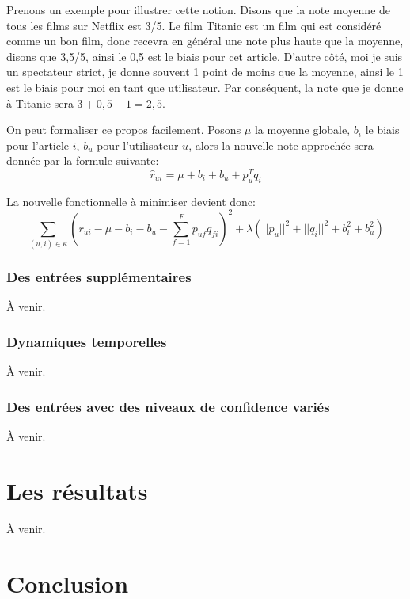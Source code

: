 \documentclass{article}
\theoremstyle{plain}
\theoremstyle{definition}
\theoremstyle{remark}
\begin{document}
Prenons un exemple pour illustrer cette notion. Disons que la note moyenne de tous les films sur Netflix est 3/5. Le film Titanic est un film qui est consid\'er\'e comme un bon film, donc recevra en g\'en\'eral une note plus haute que la moyenne, disons que 3,5/5, ainsi le 0,5 est le biais pour cet article. D'autre c\^ot\'e, moi je suis un spectateur strict, je donne souvent 1 point de moins que la moyenne, ainsi le 1 est le biais pour moi en tant que utilisateur. Par cons\'equent, la note que je donne \`a Titanic sera $3+0,5-1=2,5$.

On peut formaliser ce propos facilement. Posons $\mu$ la moyenne globale, $b_{i}$ le biais pour l'article $i$, $b_{u}$ pour l'utilisateur $u$, alors la nouvelle note approch\'ee sera donn\'ee par la formule suivante:
\[
\hat{r}_{ui}=\mu+b_{i}+b_{u}+p_u^T q_i
\]

La nouvelle fonctionnelle \`a minimiser devient donc:
\[
\sum_{(u,i)\in\kappa}(r_{ui}-\mu-b_i-b_u-\sum_{f=1}^{F}p_{uf}q_{fi})^2+\lambda(||p_u||^2+||q_i||^2+b_i^2+b_u^2)
\]

\subsubsection{Des entr\'ees suppl\'ementaires}
\`A venir.

\subsubsection{Dynamiques temporelles}
\`A venir.

\subsubsection{Des entr\'ees avec des niveaux de confidence vari\'es}
\`A venir.

\section{Les r\'esultats}
\`A venir.

\section{Conclusion}




\end{document}
